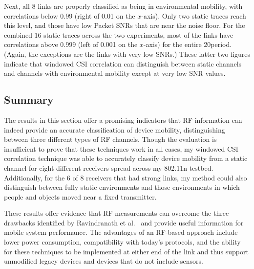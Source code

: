 Next, all 8 links are properly classified as being in environmental mobility, with correlations below 0.99 (right of 0.01 on the $x$-axis). Only two static traces reach this level, and those have low Packet SNRs that are near the noise floor. For the combined 16 static traces across the two experiments, most of the links have correlations above 0.999 (left of 0.001 on the $x$-axis) for the entire 20\s period. (Again, the exceptions are the links with very low SNRs.) These latter two figures indicate that windowed CSI correlation can distinguish between static channels and channels with environmental mobility except at very low SNR values.

\subsection{Summary}
The results in this section offer a promising indicators that RF information can indeed provide an accurate classification of device mobility, distinguishing between three different types of RF channels. Though the evaluation is insufficient to prove that these techniques work in all cases, my windowed CSI correlation technique was able to accurately classify device mobility from a static channel for eight different receivers spread across my 802.11n testbed. Additionally, for the 6 of 8 receivers that had strong links, my method could also distinguish between fully static environments and those environments in which people and objects moved near a fixed transmitter.

These results offer evidence that RF measurements can overcome the three drawbacks identified by Ravindranath et al.~\cite{Ravindranath_SensorHints} and provide useful information for mobile system performance. The advantages of an RF-based approach include lower power consumption, compatibility with today's protocols, and the ability for these techniques to be implemented at either end of the link and thus support unmodified legacy devices and devices that do not include sensors.



